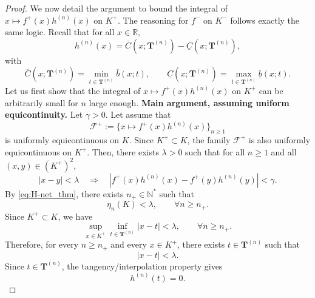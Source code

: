 \documentclass[review]{elsarticle}
\begin{document}
{\begin{proof}
\smallskip
We now detail the argument to bound the integral of $x \mapsto f^+(x)h^{(n)}(x)$ on $K^+$. The reasoning for $f^-$ on $K^-$ follows exactly the same logic. Recall that for all $x \in \mathbb{R}$,
\begin{equation}
h^{(n)}(x)=\overline C(x;\mathbf T^{(n)})-\underline C(x;\mathbf T^{(n)}),
\end{equation}
with
\begin{equation}
\overline C(x;\mathbf T^{(n)})=\min_{t\in \mathbf T^{(n)}} \overline b(x;t),
\qquad
\underline C(x;\mathbf T^{(n)})=\max_{t\in \mathbf T^{(n)}} \underline b(x;t).
\end{equation}
Let us first show that the integral of $x\mapsto f^+(x)h^{(n)}(x)$ on $K^+$ can be arbitrarily small for $n$ large enough.
%
\smallskip
\noindent\textbf{Main argument, assuming uniform equicontinuity.}
Let $\gamma>0$. Let assume that \begin{equation}
\mathcal F^+:=\{x\mapsto f^+(x)h^{(n)}(x)\}_{n\ge 1}
\end{equation}
is uniformly equicontinuous on $K$. Since $K^+\subset K$, the family $\mathcal F^+$ is also uniformly equicontinuous on $K^+$.
Then, there exists $\lambda>0$ such that for all $n\ge 1$ and all $(x,y)\in (K^+)^2$,
\begin{equation}
|x-y|<\lambda
\quad\Longrightarrow\quad
|f^+(x)h^{(n)}(x)-f^+(y)h^{(n)}(y)|<\gamma.
\label{eq:equicont_assumed_thm2}
\end{equation}
By \eqref{eq:H-net_thm}, there exists $n_{+}\in\mathbb N^*$ such that
\begin{equation}
\eta_n(K)<\lambda,
\qquad \forall n\ge n_{+}.
\end{equation}
%
Since $K^+\subset K$, we have
\begin{equation}
\sup_{x\in K^+}\inf_{t\in\mathbf{T}^{(n)}}|x-t|<\lambda,
\qquad \forall n\ge n_{+}.
\end{equation}
Therefore, for every $n\ge n_{+}$ and every $x\in K^+$, there exists $t\in\mathbf T^{(n)}$ such that
\begin{equation}
|x-t|<\lambda.
\end{equation}
%
Since $t\in \mathbf T^{(n)}$, the tangency/interpolation property gives
\begin{equation}
h^{(n)}(t)=0.
\end{equation}

\end{proof}}
\end{document}
